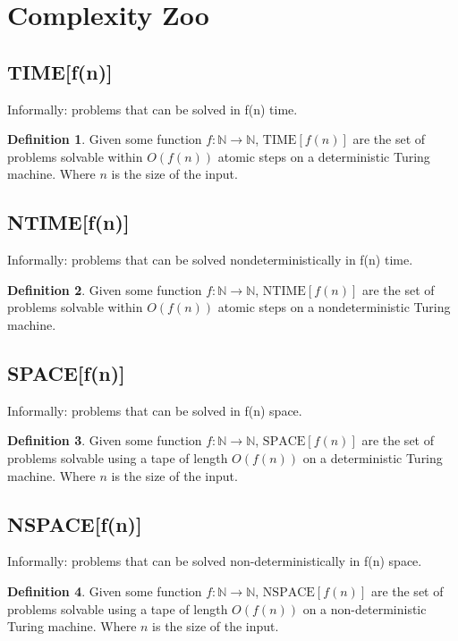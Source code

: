 \documentclass[]{article}
\theoremstyle{definition}
\newtheorem{definition}{Definition}[section]
\begin{document}
	
\section{Complexity Zoo}

\subsection{TIME[f(n)]}
\label{sec:TIME}
Informally: problems that can be solved in f(n) time. 
\begin{definition}
	Given some function $f : \mathbb{N} \to \mathbb{N}$, $\text{TIME}[f(n)]$ are the set of problems solvable within $O(f(n))$ atomic steps on a deterministic Turing machine. Where $n$ is the size of the input.
\end{definition}

\subsection{NTIME[f(n)]}
\label{sec:NTIME}
Informally: problems that can be solved nondeterministically in f(n) time. 
\begin{definition}
	Given some function $f : \mathbb{N} \to \mathbb{N}$, $\text{NTIME}[f(n)]$ are the set of problems solvable within $O(f(n))$ atomic steps on a nondeterministic Turing machine.
\end{definition}

\subsection{SPACE[f(n)]}
\label{sec:SPACE}
Informally: problems that can be solved in f(n) space. 
\begin{definition}
	Given some function $f : \mathbb{N} \to \mathbb{N}$, $\text{SPACE}[f(n)]$ are the set of problems solvable using a tape of length $O(f(n))$ on a deterministic Turing machine. Where $n$ is the size of the input.
\end{definition}

\subsection{NSPACE[f(n)]}
\label{sec:NSPACE}
Informally: problems that can be solved non-deterministically in f(n) space. 
\begin{definition}
	Given some function $f : \mathbb{N} \to \mathbb{N}$, $\text{NSPACE}[f(n)]$ are the set of problems solvable using a tape of length $O(f(n))$ on a non-deterministic Turing machine. Where $n$ is the size of the input.
\end{definition}
\end{document}
